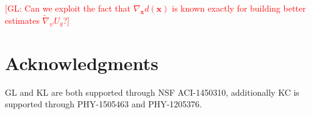 \documentclass[twocolumn,superscriptaddress,aps]{revtex4-1}
\newcommand{\glnote}[1]{\textcolor{red}{[GL: #1]}}
\theoremstyle{plain}
\begin{document}
\glnote{Can we exploit the fact that $\nabla_\mathbf{x} d(\mathbf{x})$
is known exactly for building better estimates $\tilde{\nabla}_\psi U_g$?}


\section*{Acknowledgments}

GL and KL are both supported through NSF ACI-1450310, additionally KC is
supported through PHY-1505463 and PHY-1205376.





\end{document}
